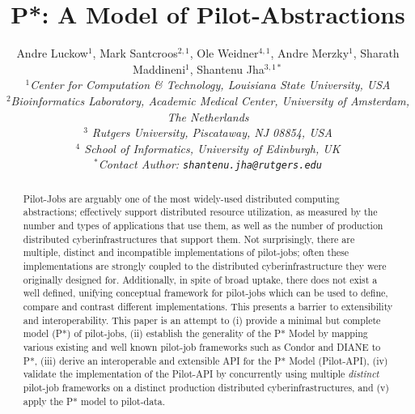 \documentclass[conference,final]{IEEEtran}
\title{P*: A Model of Pilot-Abstractions}
\date{}
\newcommand{\alnote}[1]{ {\textcolor{blue} { ***andrel: #1 }}}
\newcommand{\alnote}[1]{}
\newcommand{\up}{\vspace*{-1em}}
\newcommand{\upp}{\vspace*{-0.5em}}
\begin{document}
\ifpdf
{}
\else
{}
\fi

\author{
  Andre Luckow$^{1}$, Mark Santcroos$^{2,1}$, Ole Weidner$^{4,1}$, Andre Merzky$^{1}$, Sharath Maddineni$^{1}$, Shantenu Jha$^{3,1*}$\\
  \small{\emph{$^{1}$Center for Computation \& Technology, Louisiana State University, USA}}\\
  \small{\emph{$^{2}$Bioinformatics Laboratory, Academic Medical Center, University of Amsterdam, The Netherlands}}\\
  \small{\emph{$^{3}$ Rutgers University, Piscataway, NJ 08854, USA}}\\
  \small{\emph{$^{4}$ School of Informatics, University of Edinburgh, UK }}\\
  \small{\emph{$^{*}$Contact Author: \texttt{shantenu.jha@rutgers.edu}}}\\
  \up\up\up\up }

\maketitle

\begin{abstract} 
  \up 
  Pilot-Jobs are arguably one of the most widely-used distributed
  computing abstractions; 
  effectively support distributed resource utilization, as measured by
  the number and types of applications that use them, as well as the
  number of production distributed cyberinfrastructures that support
  them.  Not surprisingly, there are multiple, distinct and
  incompatible implementations of pilot-jobs; often these
  implementations are strongly coupled to the distributed
  cyberinfrastructure they were originally designed for.
  Additionally, in spite of broad uptake, there does not exist a well
  defined, unifying conceptual framework for pilot-jobs which can be
  used to define, compare and contrast different implementations. This
  presents a barrier to extensibility and interoperability. This paper
  is an attempt to (i) provide a minimal but complete model (P*) of
  pilot-jobs, (ii) establish the generality of the P* Model by mapping
  various existing and well known pilot-job frameworks such as Condor
  and DIANE to P*, (iii) derive an interoperable and extensible API
  for the P* Model (Pilot-API), (iv) validate the implementation of
  the Pilot-API by concurrently using multiple {\it distinct}
  pilot-job frameworks on a distinct production distributed
  cyberinfrastructures, and (v) apply the P* model to pilot-data.

  \upp\upp\upp\up


\end{abstract}
\end{document}
